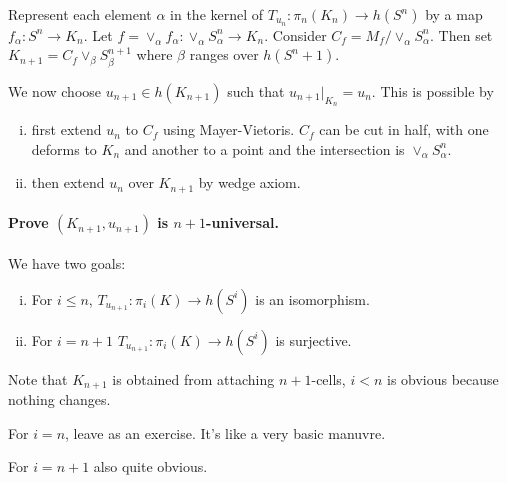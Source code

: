 \documentclass[11pt, oneside]{article}   	%
\theoremstyle{definition}
\begin{document}
Represent each element $\alpha$ in the kernel of $T_{u_n}:\pi_n(K_n)\to h(S^n)$ by a map $f_\alpha: S^n\to K_n$. Let $f=\vee_ \alpha f_\alpha:\vee_\alpha S^n_\alpha\to K_n$. Consider $C_f=M_f/\vee_\alpha S^n_\alpha$. Then set $K_{n+1}=C_f\vee_\beta S_\beta^{n+1}$ where $\beta$ ranges over $h(S^n+1)$.

We now choose $u_{n+1}\in h(K_{n+1})$ such that $u_{n+1}|_{K_n}=u_n$. This is possible by
\begin{enumerate}[(i)]
	\item first extend $u_n$ to $C_f$ using Mayer-Vietoris. $C_f$ can be cut in half, with one deforms to $K_n$ and another to a point and the intersection is $\vee_\alpha S_\alpha^n$.
	\item then extend $u_n$ over $K_{n+1}$ by wedge axiom.
\end{enumerate}

\paragraph{Prove $(K_{n+1}, u_{n+1})$ is $n+1$-universal.}

We have two goals:

\begin{enumerate}[(i)]
	\item For $i\le n$, $T_{u_{n+1}}:\pi_i(K)\to h(S^i)$ is an isomorphism.
	\item For $i=n+1$ $T_{u_{n+1}}:\pi_{i}(K)\to h(S^i)$ is surjective.
\end{enumerate}

Note that $K_{n+1}$ is obtained from attaching $n+1$-cells, $i<n$ is obvious because nothing changes.

For $i=n$, leave as an exercise. It's like a very basic manuvre.

For $i=n+1$ also quite obvious.
\appendix
\end{document}
